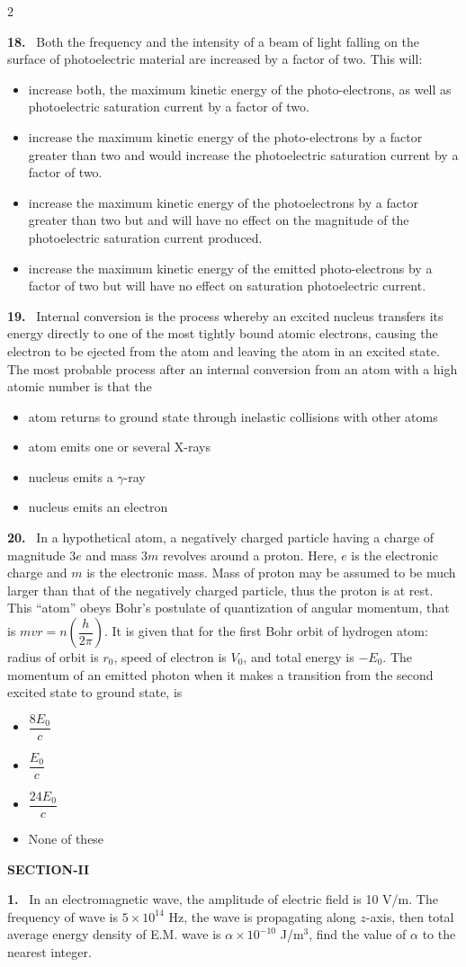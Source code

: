 \documentclass[10pt]{extarticle}
\newcommand{\sect}[1]{\par\smallskip\noindent\textbf{#1}\par}
\newcommand{\qn}[1]{\par\smallskip\noindent\textbf{#1.}~}
\newenvironment{qoptions}{\begin{itemize}[leftmargin=1.8em,itemsep=1pt,topsep=2pt,label={}]}{\end{itemize}}
\newcommand{\opt}[2]{\item[(#1)] #2}
\begin{document}
\begin{multicols}{2}
\begin{qoptions}
\end{qoptions}
\qn{18} Both the frequency and the intensity of a beam of light falling on the surface of photoelectric material are increased by a factor of two. This will:
\begin{qoptions}
\opt{A}{increase both, the maximum kinetic energy of the photo-electrons, as well as photoelectric saturation current by a factor of two.}
\opt{B}{increase the maximum kinetic energy of the photo-electrons by a factor greater than two and would increase the photoelectric saturation current by a factor of two.}
\opt{C}{increase the maximum kinetic energy of the photoelectrons by a factor greater than two but and will have no effect on the magnitude of the photoelectric saturation current produced.}
\opt{D}{increase the maximum kinetic energy of the emitted photo-electrons by a factor of two but will have no effect on saturation photoelectric current.}
\end{qoptions}
\qn{19} Internal conversion is the process whereby an excited nucleus transfers its energy directly to one of the most tightly bound atomic electrons, causing the electron to be ejected from the atom and leaving the atom in an excited state. The most probable process after an internal conversion from an atom with a high atomic number is that the
\begin{qoptions}
\opt{A}{atom returns to ground state through inelastic collisions with other atoms}
\opt{B}{atom emits one or several X-rays}
\opt{C}{nucleus emits a $\gamma$-ray}
\opt{D}{nucleus emits an electron}
\end{qoptions}
\qn{20} In a hypothetical atom, a negatively charged particle having a charge of magnitude $3e$ and mass $3m$ revolves around a proton. Here, $e$ is the electronic charge and $m$ is the electronic mass. Mass of proton may be assumed to be much larger than that of the negatively charged particle, thus the proton is at rest. This ``atom'' obeys Bohr's postulate of quantization of angular momentum, that is $mvr=n\left(\dfrac h{2\pi}\right)$. It is given that for the first Bohr orbit of hydrogen atom: radius of orbit is $r_0$, speed of electron is $V_0$, and total energy is $-E_0$. The momentum of an emitted photon when it makes a transition from the second excited state to ground state, is
\begin{qoptions}
\opt{A}{$\dfrac{8E_0}c$}
\opt{B}{$\dfrac{E_0}c$}
\opt{C}{$\dfrac{24E_0}c$}
\opt{D}{None of these}
\end{qoptions}
\sect{SECTION-II}
\qn{1} In an electromagnetic wave, the amplitude of electric field is 10 V/m. The frequency of wave is $5\times10^{14}$ Hz, the wave is propagating along $z$-axis, then total average energy density of E.M. wave is $\alpha\times10^{-10}$ J/m$^3$, find the value of $\alpha$ to the nearest integer.

\end{multicols}
\end{document}
